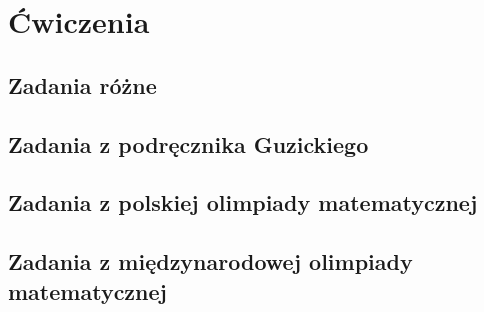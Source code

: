 \documentclass{greaseproof}
\begin{document}
\chapter{Ćwiczenia}
\section{Zadania różne}


\section{Zadania z podręcznika Guzickiego}


\section{Zadania z polskiej olimpiady matematycznej}


\section{Zadania z międzynarodowej olimpiady matematycznej}


{}


\raggedright
{}
\printindex

\printindex[persons]
\end{document}
